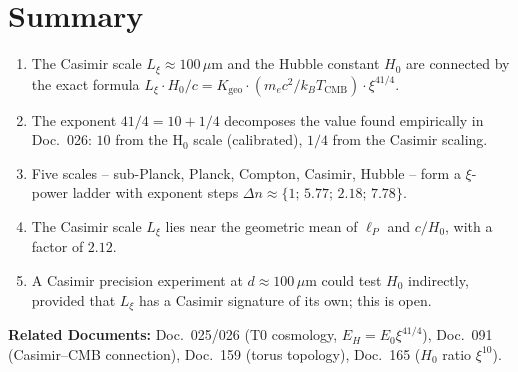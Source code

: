 \section{Summary}
\label{sec:summary}

\begin{foundation}
    \begin{enumerate}
        \item The Casimir scale $L_\xi \approx 100\,\mu\text{m}$ and the
              Hubble constant $H_0$ are connected by the exact formula
              $L_\xi \cdot H_0/c = K_\text{geo} \cdot (m_e c^2/k_B T_\text{CMB}) \cdot \xi^{41/4}$.
        \item The exponent $41/4 = 10 + 1/4$ decomposes the value found
              empirically in Doc.~026: $10$ from the H$_0$ scale
              (calibrated), $1/4$ from the Casimir scaling.
        \item Five scales -- sub-Planck, Planck, Compton, Casimir, Hubble --
              form a $\xi$-power ladder with exponent steps
              $\Delta n \approx \{1;\,5.77;\,2.18;\,7.78\}$.
        \item The Casimir scale $L_\xi$ lies near the geometric mean
              of $\ell_P$ and $c/H_0$, with a factor of $2.12$.
        \item A Casimir precision experiment at $d \approx 100\,\mu\text{m}$
              could test $H_0$ indirectly, provided that $L_\xi$ has a
              Casimir signature of its own; this is open.
    \end{enumerate}
\end{foundation}

\vspace{1.5em}
\noindent\textbf{Related Documents:}
Doc.~025/026 (T0 cosmology, $E_H = E_0\xi^{41/4}$),
Doc.~091 (Casimir--CMB connection),
Doc.~159 (torus topology),
Doc.~165 ($H_0$ ratio $\xi^{10}$).
